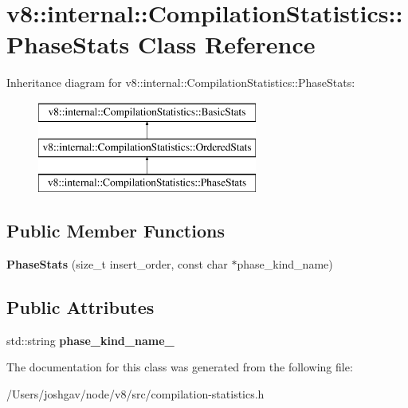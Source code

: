 \hypertarget{classv8_1_1internal_1_1_compilation_statistics_1_1_phase_stats}{}\section{v8\+:\+:internal\+:\+:Compilation\+Statistics\+:\+:Phase\+Stats Class Reference}
\label{classv8_1_1internal_1_1_compilation_statistics_1_1_phase_stats}
Inheritance diagram for v8\+:\+:internal\+:\+:Compilation\+Statistics\+:\+:Phase\+Stats\+:\begin{figure}[H]
\begin{center}
\leavevmode
\includegraphics[height=3.000000cm]{classv8_1_1internal_1_1_compilation_statistics_1_1_phase_stats}
\end{center}
\end{figure}
\subsection*{Public Member Functions}
\begin{DoxyCompactItemize}
\item 
{\bfseries Phase\+Stats} (size\+\_\+t insert\+\_\+order, const char $\ast$phase\+\_\+kind\+\_\+name)\hypertarget{classv8_1_1internal_1_1_compilation_statistics_1_1_phase_stats_adebe4325b458a2da54fdf687812b4679}{}\label{classv8_1_1internal_1_1_compilation_statistics_1_1_phase_stats_adebe4325b458a2da54fdf687812b4679}

\end{DoxyCompactItemize}
\subsection*{Public Attributes}
\begin{DoxyCompactItemize}
\item 
std\+::string {\bfseries phase\+\_\+kind\+\_\+name\+\_\+}\hypertarget{classv8_1_1internal_1_1_compilation_statistics_1_1_phase_stats_adeb57ba819c8c3a3c33f8d4762bee9f1}{}\label{classv8_1_1internal_1_1_compilation_statistics_1_1_phase_stats_adeb57ba819c8c3a3c33f8d4762bee9f1}

\end{DoxyCompactItemize}


The documentation for this class was generated from the following file\+:\begin{DoxyCompactItemize}
\item 
/\+Users/joshgav/node/v8/src/compilation-\/statistics.\+h\end{DoxyCompactItemize}
